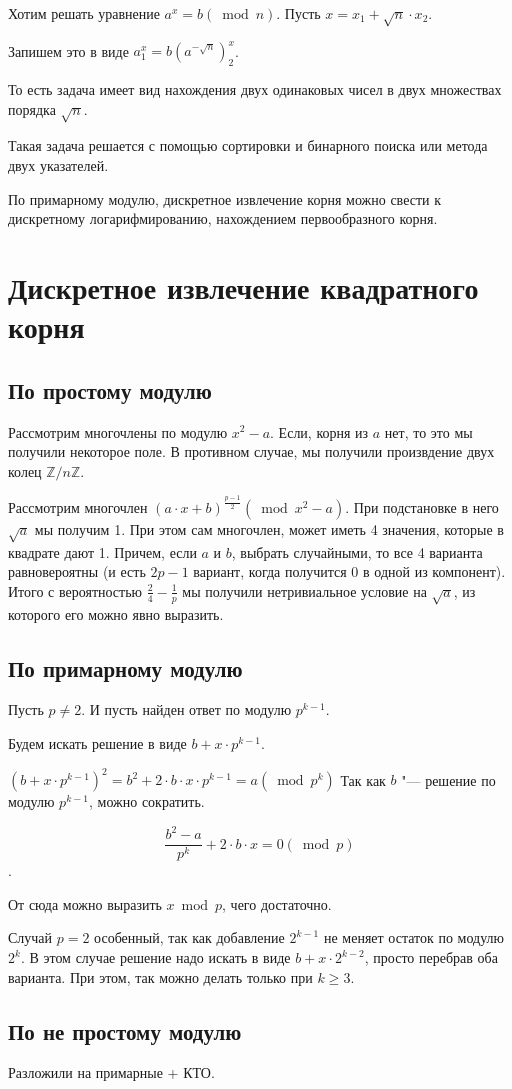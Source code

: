 \documentclass[12pt,a4paper]{article}
\newcommand{\Z}{\mathbb{Z}}
\theoremstyle{plain}
\begin{document}
Хотим решать уравнение $a ^ x = b (\bmod n)$.
Пусть $x = x_1 + \sqrt{n} \cdot x_2$.

Запишем это в виде $a ^x_1 = b (a^{-\sqrt{n}})^x_2$.

То есть задача имеет вид нахождения двух одинаковых чисел
в двух множествах порядка $\sqrt{n}$.

Такая задача решается с помощью сортировки и бинарного поиска или 
метода двух указателей.

По примарному модулю, дискретное извлечение корня можно свести к дискретному логарифмированию,
нахождением первообразного корня.

\section{Дискретное извлечение квадратного корня}

\subsection{По простому модулю}

Рассмотрим многочлены по модулю $x^2 - a$. 
Если, корня из $a$ нет, то это мы получили некоторое поле.
В противном случае, мы получили произвдение двух колец $\Z / n\Z$.

Рассмотрим многочлен $(a \cdot x + b)^{\frac{p - 1}{2}} (\bmod x^2 - a)$. При подстановке в него
$\sqrt{a}$ мы получим 1. При этом сам многочлен, может иметь 4 значения, которые в квадрате дают 1.
Причем, если $a$ и $b$, выбрать случайными, то все 4 варианта равновероятны (и есть $2p-1$ вариант, когда 
получится 0 в одной из компонент). 
Итого с вероятностью $\frac{2}{4} - \frac{1}{p}$ мы получили нетривиальное условие на $\sqrt{a}$,
из которого его можно явно выразить. 

\subsection{По примарному модулю}

Пусть $p \neq 2$. И пусть найден ответ по модулю $p^{k-1}$.

Будем искать решение в виде $b + x \cdot p^{k-1}$.

$(b + x \cdot p^{k-1})^2 = b^2 + 2 \cdot b \cdot x \cdot p^{k-1} = a (\bmod p^{k})$
Так как $b$ "--- решение по модулю $p^{k-1}$, можно сократить.

$$\frac{b^2 - a}{p^k} + 2 \cdot b \cdot x = 0 (\bmod p)$$.

От сюда можно выразить $x \bmod p$, чего достаточно.
                                                               
Случай $p = 2$ особенный, так как добавление $2^{k-1}$ не меняет остаток по модулю $2^k$.
В этом случае решение надо искать в виде $b + x \cdot 2^{k-2}$, просто перебрав оба варианта.
При этом, так можно делать только при $k \ge 3$. 

\subsection{По не простому модулю} 

Разложили на примарные + КТО.
\end{document}
